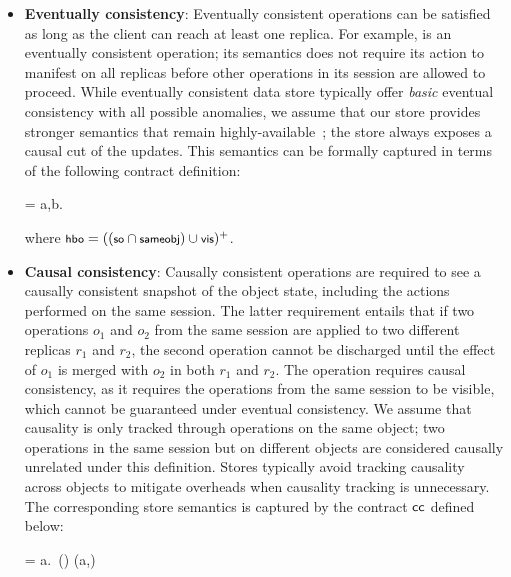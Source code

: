 \begin{itemize}
\setlength{\itemsep}{2pt}

\item \textbf{Eventually consistency}: Eventually consistent operations can
  be satisfied as long as the client can reach at least one replica. For
  example,  is an eventually consistent operation; its semantics
  does not require its action to manifest on all replicas before other
  operations in its session are allowed to proceed. While eventually
  consistent data store typically offer \emph{basic} eventual consistency
  with all possible anomalies, we assume that our store provides stronger
  semantics that remain highly-available~\cite{BailisHAT,COPS}; the store
  always exposes a causal cut of the updates. This semantics can be formally
  captured in terms of the following contract definition:

  \vspace{-1em}
  \begin{smathpar}
  \ecc = \forall a,b. ~ \wedge {} \Rightarrow {}
  \end{smathpar}
  \noindent where $\small \hboZ = ((\soZ \cap \sameobjZ) \cup \visZ)^+$.

\item \textbf{Causal consistency}: Causally consistent operations
  are required to see a causally consistent snapshot of the object state,
  including the actions performed on the same session.  The latter
  requirement entails that if two operations $o_1$ and $o_2$ from the
  same session are applied to two different replicas $r_1$ and $r_2$,
  the second operation cannot be discharged until the effect of $o_1$ is
  merged with $o_2$ in both $r_1$ and $r_2$. The 
  operation requires causal consistency, as it requires the operations
  from the same session to be visible, which cannot be guaranteed under
  eventual consistency. We assume that causality is only tracked through
  operations on the same object; two operations in the same session but
  on different objects are considered causally unrelated under this
  definition. Stores typically avoid tracking causality across objects
  to mitigate overheads when causality tracking is unnecessary. The
  corresponding store semantics is captured by the contract ${\sf cc}$
  defined below:

  \vspace{-1em}
  \begin{smathpar}
  \ccc = \forall a.~(\hboZ \cap \sameobjZ) (a,\cureff) \Rightarrow {}
  \end{smathpar}


\end{itemize}
